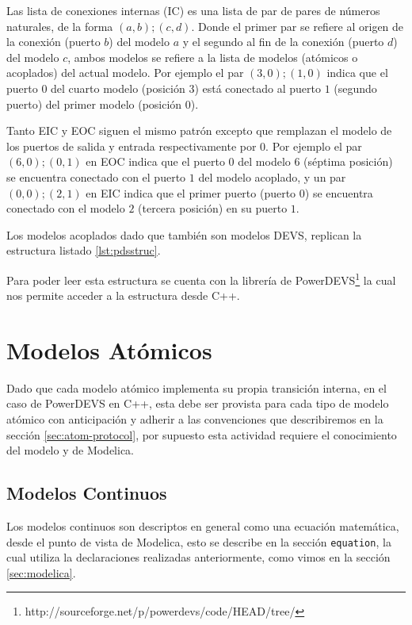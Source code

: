         Las lista de conexiones internas (IC) es una lista de par de pares de números naturales, de la forma $(a,b);(c,d)$.
        Donde el primer par se refiere al origen de la conexión (puerto $b$) del modelo $a$ y el segundo al fin de la conexión (puerto $d$) 
        del modelo $c$, ambos modelos se refiere a la lista de modelos (atómicos o acoplados) del actual modelo.
        Por ejemplo el par $(3,0);(1,0)$ indica que el puerto $0$ del cuarto modelo (posición $3$) está conectado al puerto $1$ (segundo puerto) del primer 
	modelo (posición $0$).

        Tanto EIC y EOC siguen el mismo patrón excepto que remplazan el modelo de los puertos de salida y entrada respectivamente por $0$. Por ejemplo el par 
        $(6,0);(0,1)$ en EOC indica que el puerto $0$ del modelo $6$ (séptima posición)  se encuentra conectado con el puerto $1$ del modelo 
        acoplado, y un par $(0,0);(2,1)$ en EIC indica que el primer puerto (puerto $0$) se encuentra conectado con el modelo $2$ (tercera posición) en su puerto $1$.

        Los modelos acoplados dado que también son modelos DEVS, replican la estructura listado \ref{lst:pdsstruc}.

        Para poder leer esta estructura se cuenta con la librería de PowerDEVS\footnote{http://sourceforge.net/p/powerdevs/code/HEAD/tree/} la cual nos permite acceder
        a la estructura desde C++. 

\section{Modelos Atómicos}
        

	Dado que cada modelo atómico implementa su propia transición interna, en el caso de PowerDEVS en C++, esta  debe ser provista para cada tipo de 
	modelo atómico con anticipación y adherir a las convenciones que describiremos en la sección \ref{sec:atom-protocol}, por supuesto esta actividad requiere el conocimiento del modelo y de Modelica.

\subsection{Modelos Continuos}

	Los modelos continuos son descriptos en general como una ecuación matemática, desde el punto de vista de Modelica, esto se describe en la sección 
	\texttt{equation}, la cual utiliza la declaraciones realizadas anteriormente, como vimos en la sección \ref{sec:modelica}.

